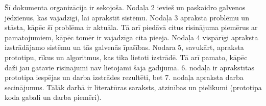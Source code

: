Šī dokumenta organizācija ir sekojoša. Nodaļa 2 ievieš un paskaidro galvenos jēdzienus, kas vajadzīgi, lai aprakstīt sistēmu. Nodaļa 3 apraksta problēmu un stāsta, kāpēc šī problēma ir aktuāla. Tā arī piedāvā citus risinājuma piemērus ar pamatojumiem, kāpēc tomēr ir vajadzīga cita pieeja. Nodaļa 4 vispārīgi apraksta izstrādājamo sistēmu un tās galvenās īpašības. Nodara 5, savukārt, apraksta prototipu, rīkus un algoritmus, kas tika lietoti izstrādē. Tā arī pamato, kāpēc daži jau gatavie risinājumi nav lietojami šajā gadījumā. 6. nodaļā ir aprakstītas prototipa iespējas un darba izstrādes rezultēti, bet 7. nodaļa apraksta darba secinājumus. Tālāk darbā ir literatūras saraksts, atzinības un pielikumi (prototipa koda gabali un darba piemēri).